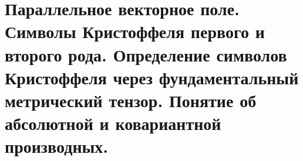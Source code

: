 \chapter{Параллельное векторное поле. Символы Кристоффеля первого и второго
рода. Определение символов Кристоффеля через фундаментальный метрический
тензор. Понятие об абсолютной и ковариантной производных.}

\newpage
